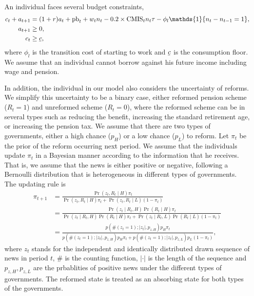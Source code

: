 \documentclass[12pt]{article}
\newcommand{\abs}[1]{\left|#1\right|}
\begin{document}
\begin{CJK*}{UTF8}{bsmi}
An individual faces several budget constraints,
\begin{align}
    c_t + a_{t+1} &= (1+r)a_t + \text{pb}_t + w_tn_t - 0.2\times\text{CMIS}_tn_t\tau - \phi_l\mathds{1}\{n_t-n_{t-1}=1\},\label{eq:asset-accumulation}\\
    a_{t+1} &\geq 0,\label{eq:no-borrow}\\
    c_t &\geq \underaccent{\bar}{c}\label{eq:cfloor},
\end{align}
where \(\phi_l\) is the transition cost of starting to work 
and \(\underaccent{\bar}{c}\) is the consumption floor. We 
assume that an individual cannot borrow against his future 
income including wage and pension. 

In addition, the individual in our model also considers the 
uncertainty of reforms. We simplify this uncertainty to be a 
binary case, either reformed pension scheme (\(R_t = 1\)) and 
unreformed scheme (\(R_t = 0\)), where the reformed scheme 
can be in several types such as reducing the benefit, 
increasing the standard retirement age, or increasing the 
pension tax. We assume that there are two types of 
governments, either a high chance (\(p_H\)) or a low chance 
(\(p_L\)) to reform. Let \(\pi_t\) be the prior of the reform 
occurring next period. We assume that the individuals update 
\(\pi_t\) in a Bayesian manner according to the information 
that he receives. That is, we assume that the news is either 
positive or negative, following a Bernoulli distribution that 
is heterogeneous in different types of governments. The 
updating rule is 
\begin{equation}\label{eq:update}
    \begin{split}
        \pi_{t+1} 
        &= \frac{\Pr(z_t, R_t\mid H)\pi_t}{\Pr(z_t, R_t\mid H)\pi_t + \Pr(z_t, R_t\mid L)(1-\pi_t)} \\
        &= \frac{\Pr(z_t\mid R_t,H)\Pr(R_t\mid H)\pi_t}{\Pr(z_t\mid R_t,H)\Pr(R_t\mid H)\pi_t + \Pr(z_t\mid R_t,L)\Pr(R_t\mid L)(1-\pi_t)}\\
        &= \frac{p(\#(z_t=1);\abs{z_t},p_{z,H})p_H \pi_t}{p(\#(z_t=1);\abs{z_t},p_{z,H})p_H \pi_t + p(\#(z_t=1);\abs{z_t},p_{z,L})p_L(1-\pi_t)},
    \end{split}
\end{equation}
where \(z_t\) stands for the independent and identically 
distributed drawn sequence of news in period \(t\), $\#$ is 
the counting function, $\abs{\cdot}$ is the length of the 
sequence and $p_{z,H}, p_{z,L}$ are the prbablities of 
positive news under the different types of governments. 
The reformed state is treated as an absorbing state for both 
types of the governments. 


\end{CJK*}
\end{document}
